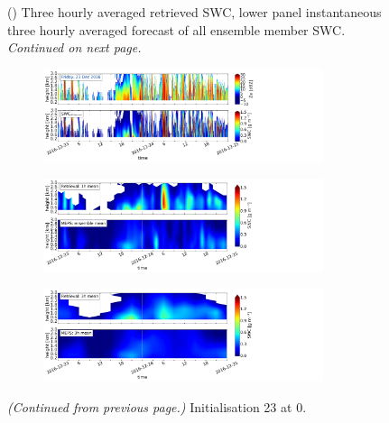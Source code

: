 \begin{figure}[H]
{		%
		(\protect{}) Three hourly averaged retrieved SWC, lower panel instantaneous three hourly averaged forecast of all ensemble member SWC.%
		\textit{Continued on next page.}  }\label{fig:ret:SWC}
\end{figure}
\begin{figure}[H]\ContinuedFloat
	\centering
	\begin{subfigure}[t]{\textwidth}
		\centering
		\includegraphics[trim={0.cm 2.2cm 19.cm 0.5cm},clip,width=0.9\textwidth]{./fig_obs_ret/20161223}
		\caption{}\label{fig:SWC:ret_23}
	\end{subfigure}
	\begin{subfigure}[t]{\textwidth}
		\centering
		\includegraphics[trim={0.cm 2.2cm 19.cm 0.5cm},clip,width=0.9\textwidth]{./fig_vert_SWC_EM/20161223}
		\caption{}\label{fig:SWC_EM:23}
	\end{subfigure}
	\begin{subfigure}[t]{\textwidth}
		\centering
		\includegraphics[trim={0.cm 0.8cm 19.cm 0.5cm},clip,width=0.9\textwidth]{./fig_vert_SWC_3h/20161223}
		\caption{}\label{fig:SWC3h:23}
	\end{subfigure}
	\caption{\textit{(Continued from previous page.)} Initialisation \SI{23}{\dec} at \SI{0}{\UTC}.}
\end{figure}
